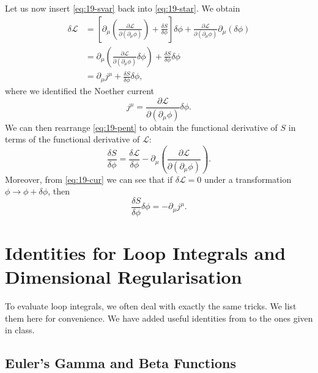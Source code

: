 \begin{appendices}
Let us now insert \eqref{eq:19-svar} back into \eqref{eq:19-star}.  We obtain
\begin{align}
  \delta \mathscr{L} &= \left[ \partial_{\mu} \left( \frac{\partial \mathscr{L}}{\partial (\partial_{\mu} \phi)} \right) + \frac{\delta S}{\delta \phi} \right] \delta\phi 
  + \frac{\partial \mathscr{L}}{\partial (\partial_{\mu} \phi)} \partial_{\mu} (\delta\phi) \\
			 &= \partial_{\mu} \left( \frac{\partial \mathscr{L}}{\partial (\partial_{\mu} \phi)} \delta\phi \right) + \frac{\delta S}{\delta \phi} \delta\phi \label{eq:19-pent} \\
			 &= \partial_{\mu} j^{\mu} + \frac{\delta S}{\delta \phi} \delta \phi, 
			 \label{eq:19-cur}
\end{align}
where we identified the Noether current
\begin{equation}
  j^{\mu} = \frac{\partial \mathscr{L}}{\partial (\partial_{\mu} \phi)} \delta \phi.
\end{equation}
We can then rearrange \eqref{eq:19-pent} to obtain the functional derivative of $S$ in terms of the functional derivative of $\mathscr{L}$:
\begin{equation}
  \frac{\delta S}{\delta \phi} = \frac{\delta \mathscr{L}}{\delta \phi} - \partial_{\mu} \left( \frac{\partial \mathscr{L}}{\partial (\partial_{\mu} \phi)} \right).
\end{equation}
Moreover, from \eqref{eq:19-cur} we can see that if $\delta \mathscr{L} = 0$ under a transformation $\phi \to \phi + \delta \phi$, then
\begin{equation}
  \label{eq:apx-cur}
  \frac{\delta S}{\delta \phi} \delta \phi = -\partial_{\mu} j^{\mu}.
\end{equation}

\chapter{Identities for Loop Integrals and Dimensional Regularisation}%
\label{apx:loop_integral_identities}

To evaluate loop integrals, we often deal with exactly the same tricks. We list them here for convenience. We have added useful identities from \cite[Apx.~B]{schwartz} to the ones given in class.

\section{Euler's Gamma and Beta Functions}%
\label{sec:gamma_function}


\end{appendices}

